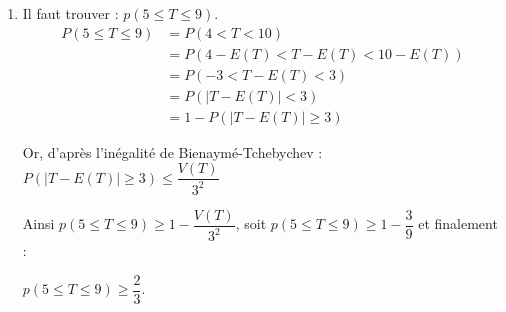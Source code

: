 \begin{enumerate}
\begin{enumerate}
$\bullet~~V(T) = V(T_1) + V(T_2) = 2 + 1 = 3$.
		\item Il faut trouver : $p(5\leqslant T \leqslant 9)$.
\begin{align*} P(5 \leqslant T \leqslant 9) &= P(4 < T < 10) \\ &= P(4 - E(T) < T - E(T) < 10 - E(T)) \\ &= P(-3 < T - E(T) < 3) \\ &= P(|T - E(T)| < 3) \\ &= 1 - P(|T - E(T)| \geqslant 3) \end{align*}

Or, d'après l'inégalité de Bienaymé-Tchebychev : $ P(|T - E(T)| \geqslant 3)\leqslant \dfrac{V(T)}{3^2}$

Ainsi $p(5\leqslant T \leqslant 9) \geqslant 1 - \dfrac{V(T)}{3^2}$, soit $p(5\leqslant T \leqslant 9) \geqslant 1 - \dfrac39$ et finalement :

$p(5\leqslant T \leqslant 9) \geqslant \dfrac23$.

	\end{enumerate}
\end{enumerate}

\bigskip
